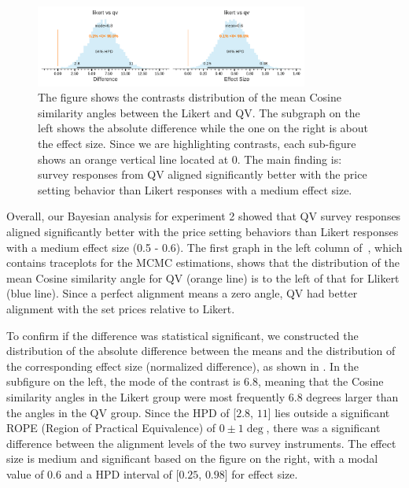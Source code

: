 \begin{figure}[htpb]
  \centering
  \includegraphics[trim= 0in 0in 0in 0in, clip, width=0.8\textwidth, keepaspectratio=true]{"content/image/Votes_Prices_StudentT_differences_and_effects.pdf"}
  \caption{
    The figure shows the contrasts distribution of the mean Cosine similarity angles between the Likert and QV. The subgraph on the left shows the absolute difference while the one on the right is about the effect size. Since we are highlighting contrasts, each sub-figure shows an orange vertical line located at 0. The main finding is: survey responses from QV aligned significantly better with the price setting behavior than Likert responses with a medium effect size.
  }
  \label{fig:contrast_exp2}
\end{figure}

Overall, our Bayesian analysis for experiment 2 showed that QV survey responses aligned significantly better with the price setting behaviors than Likert responses with a medium effect size (0.5 - 0.6). The first graph in the left column of~, which contains traceplots for the MCMC estimations, shows that the distribution of the mean Cosine similarity angle for QV (orange line) is to the left of that for Llikert (blue line). Since a perfect alignment means a zero angle, QV had better alignment with the set prices relative to Likert. 

To confirm if the difference was statistical significant, we constructed the distribution of the absolute difference between the means and the distribution of the corresponding effect size (normalized difference), as shown in . In the subfigure on the left, the mode of the contrast is $6.8$, meaning that the Cosine similarity angles in the Likert group were most frequently $6.8$ degrees larger than the angles in the QV group. Since the HPD of [$2.8$, $11$] lies outside a significant ROPE (Region of Practical Equivalence) of $0 \pm 1 \deg$, there was a significant difference between the alignment levels of the two survey instruments. The effect size is medium and significant based on the figure on the right, with a modal value of $0.6$ and a HPD interval of [$0.25$, $0.98$] for effect size.


